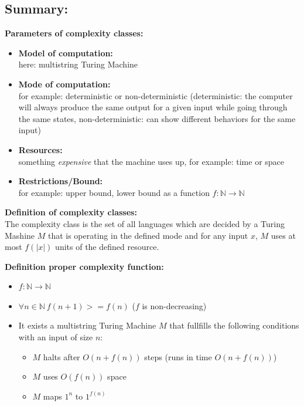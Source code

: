 \documentclass[a4]{scrartcl}
\begin{document}
\subsection*{Summary:}

\textbf{Parameters of complexity classes:} \cite{CC, book}

\begin{itemize}
\item \textbf{Model of computation:} \\
here: multistring Turing Machine
\item \textbf{Mode of computation:} \\
for example: deterministic or non-deterministic (deterministic: the computer will always produce the same output for a given input while going through the same states, non-deterministic: can show different behaviors for the same input)
\item \textbf{Resources:} \\ 
something \textit{expensive} that the machine uses up, for example: time or space
\item \textbf{Restrictions/Bound:} \\ 
for example: upper bound, lower bound as a function $f: \mathbb{N} \rightarrow \mathbb{N}$
\end{itemize}

\textbf{Definition of complexity classes:} \cite{book} \\
The complexity class is the set of all languages which are decided by a Turing Mashine $M$ that is operating in the defined mode and for any input $x$, $M$ uses at most $f(|x|)$ units of the defined resource.

\newpage
\textbf{Definition proper complexity function:} \cite{book, CC, GTI}
\begin{itemize}
\item $f: \mathbb{N} \rightarrow \mathbb{N}$
\item $\forall n \in \mathbb{N} \ f(n+1) >= f(n) $ ($f$ is non-decreasing)
\item It exists a multistring Turing Machine $M$ that fullfills the following conditions with an input of size $n$:
\begin{itemize}
\item $M$ halts after $O(n + f(n))$ steps (runs in time $O(n + f(n))$)
\item $M$ uses $O(f(n))$ space
\item $M$ maps $1^n$ to $1^{f(n)}$
\end{itemize}
\end{itemize}
\end{document}
